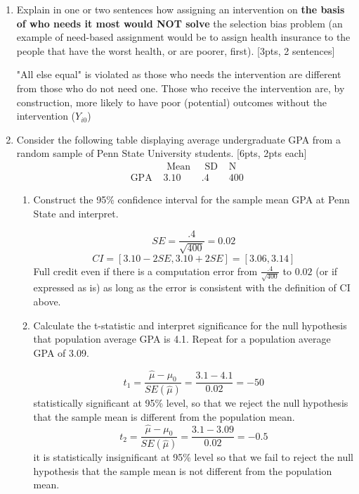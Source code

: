 \documentclass[answers]{exam}
\begin{document}
\begin{enumerate}
\item Explain in one or two sentences how assigning an intervention on \textbf{the basis of who needs it most would NOT solve} the selection bias problem (an example of need-based assignment would be to assign health insurance to the people that have the worst health, or are poorer, first). [3pts, 2 sentences]
\begin{solution}
"All else equal" is violated as those who needs the intervention are different from those who do not need one. Those who receive the intervention are, by construction, more likely to have poor (potential) outcomes without the intervention ($Y_{i0}$)
\end{solution}

\item Consider the following table displaying average undergraduate GPA from a random sample of Penn State University students. [6pts, 2pts each]
$$
\begin{array}{llll} 
& \text { Mean } & \text { SD } & \mathrm{N} \\
\hline \text { GPA } & 3.10 & .4 & 400
\end{array}
$$
 \begin{enumerate}[label=\alph*)]
    \item Construct the 95\% confidence interval for the sample mean GPA at Penn State and interpret. 
    \begin{solution}
   $$
    S E=\frac{.4}{\sqrt{400}} =0.02 $$
    $$
    CI = [3.10-2SE, 3.10+2SE] = [3.06,3.14]
    $$
    Full credit even if there is a computation error from $\frac{.4}{\sqrt{400}}$ to $0.02$ (or if expressed as is) as long as the error is consistent with the definition of CI above. 
\end{solution}

    \item Calculate the t-statistic and interpret significance for the null hypothesis that population average GPA is 4.1. Repeat for a population average GPA of 3.09. 
        \begin{solution}
$$
t_{1}=\frac{\hat{\mu}-\mu_{0}}{S E(\hat{\mu})} = \frac{3.1-4.1}{0.02} =-50$$ statistically significant at 95\% level, so that we reject the null hypothesis that the sample mean is different from the population mean. 
$$t_{2}=\frac{\hat{\mu}-\mu_{0}}{S E(\hat{\mu})} = \frac{3.1-3.09}{0.02} =-0.5$$ it is statistically insignificant at 95\% level so that we fail to reject the null hypothesis that the sample mean is not different from the population mean. 


\end{solution}
\end{enumerate}
\end{enumerate}
\end{document}
